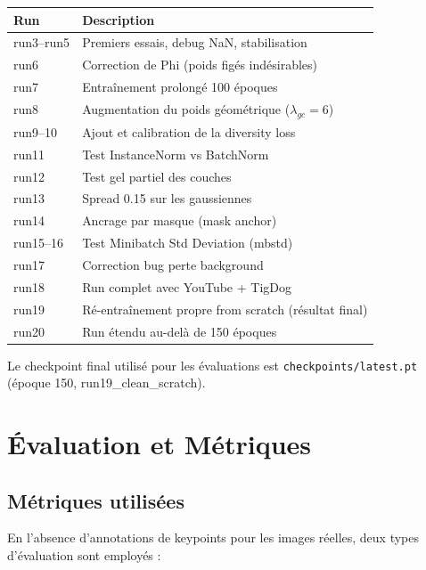 \documentclass[12pt,a4paper]{article}
\begin{document}
\begin{center}
\begin{tabular}{lp{10cm}}
\toprule
\textbf{Run} & \textbf{Description} \\
\midrule
run3--run5   & Premiers essais, debug NaN, stabilisation \\
run6         & Correction de Phi (poids figés indésirables) \\
run7         & Entraînement prolongé 100 époques \\
run8         & Augmentation du poids géométrique ($\lambda_{gc}=6$) \\
run9--10     & Ajout et calibration de la diversity loss \\
run11        & Test InstanceNorm vs BatchNorm \\
run12        & Test gel partiel des couches \\
run13        & Spread 0.15 sur les gaussiennes \\
run14        & Ancrage par masque (mask anchor) \\
run15--16    & Test Minibatch Std Deviation (mbstd) \\
run17        & Correction bug perte background \\
run18        & Run complet avec YouTube + TigDog \\
run19        & Ré-entraînement propre from scratch (résultat final) \\
run20        & Run étendu au-delà de 150 époques \\
\bottomrule
\end{tabular}
\end{center}

Le checkpoint final utilisé pour les évaluations est \texttt{checkpoints/latest.pt}
(époque 150, run19\_clean\_scratch).

\section{Évaluation et Métriques}

\subsection{Métriques utilisées}

En l'absence d'annotations de keypoints pour les images réelles, deux types
d'évaluation sont employés :
\end{document}
